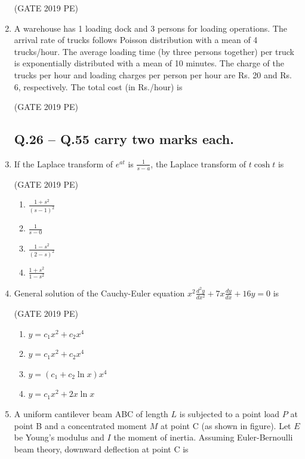 \documentclass[journal,12pt,onecolumn]{exam}
\theoremstyle{remark}
\begin{document}
\begin{enumerate}
\hfill{(GATE 2019 PE)}\\
    \item A warehouse has 1 loading dock and 3 persons for loading operations. The arrival rate of trucks follows Poisson distribution with a mean of 4 trucks/hour. The average loading time (by three persons together) per truck is exponentially distributed with a mean of 10 minutes. The charge of the trucks per hour and loading charges per person per hour are Rs. 20 and Rs. 6, respectively. The total cost (in Rs./hour) is  

    \hfill{(GATE 2019 PE)}\\


\subsection*{Q.26 -- Q.55 carry two marks each.}

\item If the Laplace transform of \(e^{at}\) is \(\frac{1}{s - a}\), the Laplace transform of \(t \cosh t\) is

  \hfill{(GATE 2019 PE)}\\
  \begin{enumerate}
      \item \(\frac{1 + s^2}{(s-1)^2}\)
      \item \(\frac{1}{s-0}\)
      \item  \(\frac{1 - s^2}{(2-s)^2}\)
      \item \(\frac{1+s^2}{1-s^2}\)
  \end{enumerate}

\item General solution of the Cauchy-Euler equation \(x^{2} \frac{d^{2}y}{dx^{2}} + 7x \frac{dy}{dx} + 16y = 0\) is

 \hfill{(GATE 2019 PE)}\\
 \begin{enumerate}
     \item \(y = c_1 x^{2} + c_2 x^{4}\)
     \item \(y = c_1 x^{2} + c_2 x^{4}\)
     \item \(y = (c_1 + c_2 \ln x) x^{4}\)
     \item \(y = c_1 x^{2} + 2x \ln x\)
 \end{enumerate}

\item A uniform cantilever beam ABC of length \(L\) is subjected to a point load \(P\) at point B and a concentrated moment \(M\) at point C (as shown in figure). Let \(E\) be Young's modulus and \(I\) the moment of inertia. Assuming Euler-Bernoulli beam theory, downward deflection at point C is


\end{enumerate}
\end{document}
